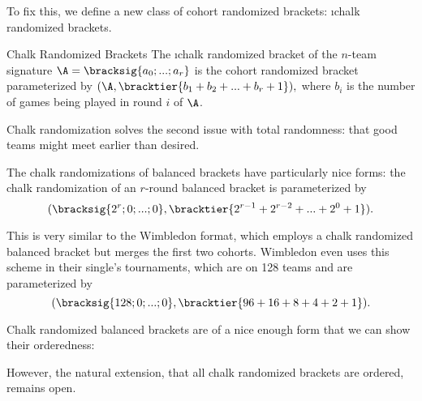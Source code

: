 {    To fix this, we define a new class of cohort randomized brackets: \i{chalk randomized brackets}.

    \begin{definition}{Chalk Randomized Brackets}{}
        The \i{chalk randomized bracket} of the $n$-team signature $\A = \bracksig{a_0; ...; a_r}$ is the cohort randomized bracket parameterized by $(\A, \bracktier{b_1 + b_2 + ... + b_r + 1}),$ where $b_i$ is the number of games being played in round $i$ of $\A$.
    \end{definition}

    Chalk randomization solves the second issue with total randomness: that good teams might meet earlier than desired.


    The chalk randomizations of balanced brackets have particularly nice forms: the chalk randomization of an $r$-round balanced bracket is parameterized by $$(\bracksig{2^r; 0; ...; 0}, \bracktier{2^{r-1} + 2^{r-2} + ... + 2^{0} + 1}).$$

    This is very similar to the Wimbledon format, which employs a chalk randomized balanced bracket but merges the first two cohorts. Wimbledon even uses this scheme in their single's tournaments, which are on 128 teams and are parameterized by $$(\bracksig{128; 0; ...; 0}, \bracktier{96 + 16 + 8 + 4 + 2 + 1}).$$

    Chalk randomized balanced brackets are of a nice enough form that we can show their orderedness:


    However, the natural extension, that all chalk randomized brackets are ordered, remains open.

}

